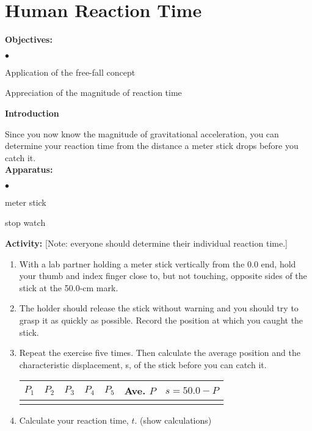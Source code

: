 
\section{Human Reaction Time}

\makelabheader %

{\noindent \bf Objectives:} \begin{list}{$\bullet$}{\itemsep0pt }

\item Application of the free-fall concept \item Appreciation of the magnitude of reaction time

\end{list}

{\noindent \bf Introduction}

{\noindent Since you now know the magnitude of gravitational acceleration, you can determine your reaction time from the distance a meter stick drops before you catch it.} \\

{\noindent \bf Apparatus:} \begin{list}{$\bullet$}{\itemsep0pt }

\item meter stick \item stop watch

\end{list}

{\noindent \bf Activity:} [Note: everyone should determine their individual reaction time.]

\begin{enumerate}

\item With a lab partner holding a meter stick vertically from the 0.0 end, hold your thumb and index finger close to, but not touching, opposite sides of the stick at the 50.0-cm mark.

\item The holder should release the stick without warning and you should try to grasp it as quickly as possible. Record the position at which you caught the stick.

\item Repeat the exercise five times. Then calculate the average position and the characteristic displacement, s, of the stick before you can catch it.

\begin{center} \begin{tabular}{|c|c|c|c|c|c|c|} \hline $P_1$ & $P_2$ & $P_3$ & $P_4$ & $P_5$ & Ave. $P$ & $s = 50.0 - P$ \\ \hline \hline & & & & & & \\ \hline \end{tabular} \end{center}

\item Calculate your reaction time, $t$. (show calculations)

\bigskip \bigskip

 \end{enumerate}


